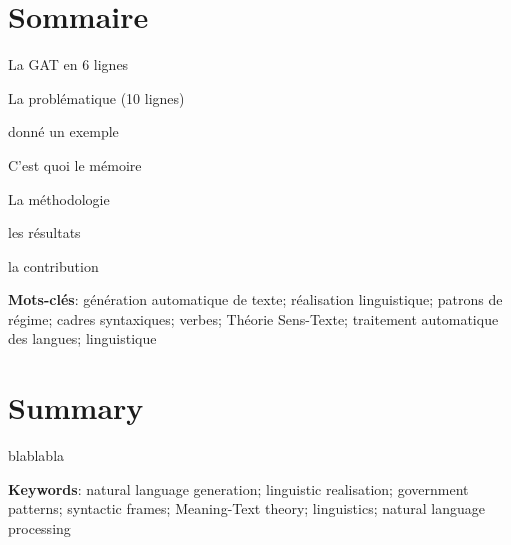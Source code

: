 \chapter*{Sommaire} 	%

\noindent

La GAT en 6 lignes
	

La problématique (10 lignes)

donné un exemple


C'est quoi le mémoire

La méthodologie

les résultats

la contribution


\textbf{Mots-clés}: génération automatique de texte; réalisation linguistique; patrons de régime; cadres syntaxiques; verbes; Théorie Sens-Texte; traitement automatique des langues; linguistique

\chapter*{Summary}

\noindent blablabla

\textbf{Keywords}: natural language generation; linguistic realisation; government patterns; syntactic frames; Meaning-Text theory; linguistics; natural language processing